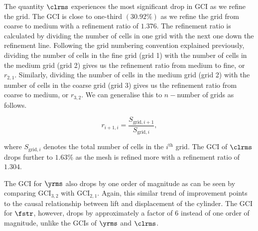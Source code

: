 \documentclass[a4paper,fleqn]{cas-sc}
\begin{document}
The quantity $\clrms$ experiences the most significant drop in GCI as we refine the grid. The GCI is close to one-third $\left ( 30.92\% \right )$ as we refine the grid from coarse to medium with a refinement ratio of $1.376$. The refinement ratio is calculated by dividing the number of cells in one grid with the next one down the refinement line. Following the grid numbering convention explained previously, dividing the number of cells in the fine grid (grid 1) with the number of cells in the medium grid (grid 2) gives us the refinement ratio from medium to fine, or $r_{2,1}$. Similarly, dividing the number of cells in the medium grid (grid 2) with the number of cells in the coarse grid (grid 3) gives us the refinement ratio from coarse to medium, or $r_{3,2}$. We can generalise this to $n-$number of grids as follows.

\begin{equation}
  r_{i+1,i} = \frac{S_{\text{grid},i+1}}{S_{\text{grid},i}},
  \label{eq:refinementRatio}
\end{equation}

\noindent where $S_{\text{grid},i}$ denotes the total number of cells in the $i^{\text{th}}$ grid. The GCI of $\clrms$ drops further to $1.63\%$ as the mesh is refined more with a refinement ratio of $1.304$.

The GCI for $\yrms$ also drops by one order of magnitude as can be seen by comparing $\text{GCI}_{3,2}$ with $\text{GCI}_{2,1}$. Again, this similar trend of improvement points to the causal relationship between lift and displacement of the cylinder. The GCI for $\fstr$, however, drops by approximately a factor of $6$ instead of one order of magnitude, unlike the GCIs of $\yrms$ and $\clrms$.
\end{document}
